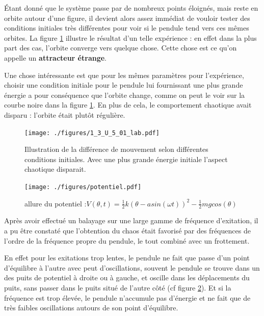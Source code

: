 \documentclass[a4paper,12pt,oneside]{article}
\begin{document}
Étant donné que le système passe par de nombreux points éloignés, mais reste en orbite autour d'une figure, il devient alors assez immédiat de vouloir tester des conditions initiales très différentes pour voir si le pendule tend vers ces mêmes orbites. La figure \ref{fig:1_3_U_5_01_lab} illustre le résultat d'un telle expérience : en effet dans la plus part des cas, l'orbite converge vers quelque chose. Cette chose est ce qu'on appelle un \textbf{attracteur étrange}.

Une chose intéressante est que pour les mêmes paramètres pour l'expérience, choisir une condition initiale pour le pendule lui fournissant une plus grande énergie a pour conséquence que l'orbite change, comme on peut le voir sur la courbe noire dans la figure \ref{fig:1_3_U_5_01_lab}. En plus de cela, le comportement chaotique avait disparu : l'orbite était plutôt régulière.

\begin{figure}[h!]
  \begin{center}
  \texttt{[image: ./figures/1\_3\_U\_5\_01\_lab.pdf]}
  \caption{Illustration de la différence de mouvement selon différentes conditions initiales. Avec une plus grande énergie initiale l'aspect chaotique disparait.} \label{fig:1_3_U_5_01_lab}
  \end{center}
\end{figure}

\begin{figure}[h!]
  \begin{center}
  \texttt{[image: ./figures/potentiel.pdf]}
  \caption{allure du potentiel :$V(\theta,t)=\frac{1}{2}k(\theta-a sin(\omega t))^2-\frac{1}{2} m g cos(\theta)$} \label{fig:potentiel}
  \end{center}
\end{figure}



Après avoir effectué un balayage sur une large gamme de fréquence d'exitation, il a pu être constaté que l'obtention du chaos était favorisé par des fréquences de l'ordre de la fréquence propre du pendule, le tout combiné avec un frottement.

En effet pour les exitations trop lentes, le pendule ne fait que passe d'un point d'équilibre à l'autre avec peut d'oscillations, souvent le pendule se trouve dans un des puits de potentiel à droite ou à gauche, et oscille dans les déplacements du puits, sans passer dans le puits situé de l'autre côté (cf figure \ref{fig:potentiel}). Et si la fréquence est trop élevée, le pendule n'accumule pas d'énergie et ne fait que de très faibles oscillations autours de son point d'équilibre.
\end{document}

